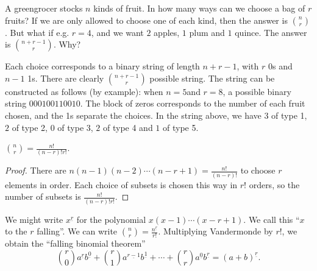 \documentclass[a4paper]{article}
\begin{document}
  \begin{eg}
    A greengrocer stocks $n$ kinds of fruit. In how many ways can we choose a bag of $r$ fruits? If we are only allowed to choose one of each kind, then the answer is ${n\choose r}$. But what if e.g. $r = 4$, and we want $2$ apples, $1$ plum and $1$ quince. The answer is ${n + r - 1\choose r}$. Why?

    Each choice corresponds to a binary string of length $n + r - 1$, with $r$ 0s and $n - 1$ 1s. There are clearly ${n + r - 1\choose r}$ possible string. The string can be constructed as follows (by example): when $n = 5$and $r=8$, a possible binary string $000100110010$. The block of zeros corresponds to the number of each fruit chosen, and the 1s separate the choices. In the string above, we have $3$ of type 1, $2$ of type 2, $0$ of type 3, $2$ of type 4 and $1$ of type 5.
  \end{eg}

  \begin{prop}
    $\displaystyle{n\choose r} = \frac{n!}{(n - r)!r!}$.
  \end{prop}

  \begin{proof}
    There are $n(n - 1)(n - 2)\cdots (n - r + 1) = \frac{n!}{(n - r)!}$ to choose $r$ elements in order. Each choice of subsets is chosen this way in $r!$ orders, so the number of subsets is $\frac{n!}{(n - r)!r!}$.
  \end{proof}

  We might write $x^{\underline{r}}$ for the polynomial $x(x - 1)\cdots (x - r + 1)$. We call this ``$x$ to the $r$ falling''. We can write $\displaystyle {n\choose r} = \frac{n^{\underline{r}}}{r!}$. Multiplying Vandermonde by $r!$, we obtain the ``falling binomial theorem''
  \[
    {r\choose 0}a^{\underline{r}}b^{\underline{0}} + {r\choose 1}a^{\underline{r - 1}}b^{\underline{1}} + \cdots + {r\choose r}a^{\underline{0}}b^{\underline{r}} = (a + b)^{\underline{r}}.
  \]
\end{document}
